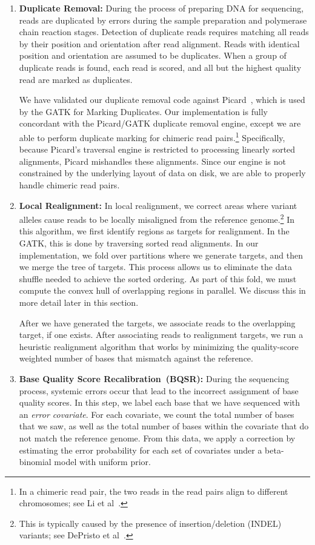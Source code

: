 \documentclass[masters]{ucbthesis}
\begin{document}
\begin{enumerate}
\item \textbf{Duplicate Removal:} During the process of preparing DNA for sequencing, reads are duplicated by
errors during the sample preparation and polymerase chain reaction stages. Detection of duplicate reads
requires matching all reads by their position and orientation after read alignment. Reads with identical position
and orientation are assumed to be duplicates. When a group of duplicate reads is found, each read is scored,
and all but the highest quality read are marked as duplicates.

We have validated our duplicate removal code against Picard~\cite{picard}, which is used by the GATK
for Marking Duplicates. Our implementation is fully concordant with the Picard/GATK duplicate removal
engine, except we are able to perform duplicate marking for chimeric read pairs.\footnote{In a chimeric read pair,
the two reads in the read pairs align to different chromosomes; see Li et al~\cite{li10}.}
Specifically, because Picard's traversal engine is restricted to processing linearly sorted alignments,
Picard mishandles these alignments. Since our engine is not constrained by the underlying layout of data
on disk, we are able to properly handle chimeric read pairs.
\item \textbf{Local Realignment:} In local realignment, we correct areas where variant alleles cause reads to be
locally misaligned from the reference genome.\footnote{This is typically caused by the presence of
insertion/deletion (INDEL) variants; see DePristo et al~\cite{depristo11}.} In this algorithm, we first identify regions
as targets for realignment. In the GATK, this is done by traversing sorted read alignments. In our implementation,
we fold over partitions where we generate targets, and then we merge the tree of targets. This process allows us
to eliminate the data shuffle needed to achieve the sorted ordering. As part of this fold, we must
compute the convex hull of overlapping regions in parallel. We discuss this in more detail later in this section.

After we have generated the targets, we associate reads to the overlapping target, if one exists. After
associating reads to realignment targets, we run a heuristic realignment algorithm that works by minimizing
the quality-score weighted number of bases that mismatch against the reference.
\item \textbf{Base Quality Score Recalibration~(BQSR):} During the sequencing process, systemic errors occur
that lead to the incorrect assignment of base quality scores. In this step, we label each base that we have
sequenced with an \emph{error covariate}. For each covariate, we count the total number of bases that we saw,
as well as the total number of bases within the covariate that do not match the reference genome. From this data, 
we apply a correction by estimating the error probability for each set of covariates under a beta-binomial model
with uniform prior.


\end{enumerate}
\end{document}
